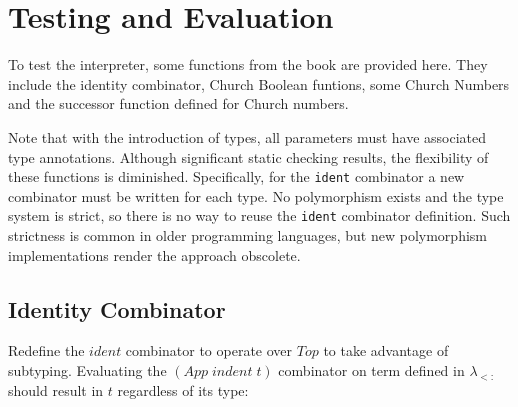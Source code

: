 \documentclass[10pt]{article}
\newcommand{\Conid}[1]{\mathit{#1}}
\newcommand{\Varid}[1]{\mathit{#1}}
\begin{document}
\section{Testing and Evaluation}

To test the interpreter, some functions from the book are provided
here.  They include the identity combinator, Church Boolean funtions,
some Church Numbers and the successor function defined for Church
numbers.

Note that with the introduction of types, all parameters must have
associated type annotations.  Although significant static checking
results, the flexibility of these functions is diminished.
Specifically, for the \texttt{ident} combinator a new combinator must
be written for each type.  No polymorphism exists and the type system
is strict, so there is no way to reuse the \texttt{ident} combinator
definition.  Such strictness is common in older programming languages,
but new polymorphism implementations render the approach obscolete.

\subsection{Identity Combinator}

Redefine the \ensuremath{\Varid{ident}} combinator to operate over \ensuremath{\Conid{Top}} to take
advantage of subtyping.  Evaluating the \ensuremath{(\Conid{App}\;\Varid{indent}\;\Varid{t})} combinator on
term defined in $\lambda_{<:}$ should result in \ensuremath{\Varid{t}} regardless of its type:
\end{document}
